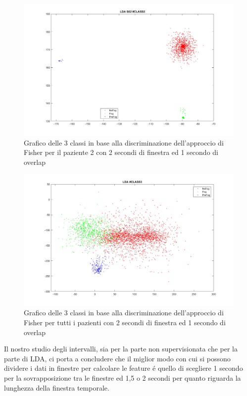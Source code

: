 \begin{figure}[]
	\centering
	\includegraphics[scale=0.3]{images/LDAS02_best.png}
	\caption{Grafico delle 3 classi in base alla discriminazione dell'approccio di Fisher per il paziente 2 con 2 secondi di finestra ed 1 secondo di overlap}
	\label{LDAS02_best.png}
\end{figure}
\begin{figure}[]
	\centering
	\includegraphics[scale=0.3]{images/LDAALL2.png}
	\caption{Grafico delle 3 classi in base alla discriminazione dell'approccio di Fisher per tutti i pazienti con 2 secondi di finestra ed 1 secondo di overlap}
	\label{LDAALL2.png}
\end{figure}
Il nostro studio degli intervalli, sia per la parte non supervisionata che per la parte di LDA, ci porta a concludere che il miglior modo con cui si possono dividere i dati in finestre per calcolare le feature é quello di scegliere 1 secondo per la sovrapposizione tra le finestre ed 1,5 o 2 secondi per quanto riguarda la lunghezza della finestra temporale.

